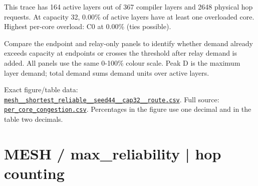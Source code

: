 \documentclass[10pt,a4paper]{article}
\begin{document}
This trace has 164 active layers out of 367 compiler layers and 2648 physical hop requests. At capacity 32, 0.00\% of active layers have at least one overloaded core. Highest per-core overload: C0 at 0.00\% (ties possible).\par
Compare the endpoint and relay-only panels to identify whether demand already exceeds capacity at endpoints or crosses the threshold after relay demand is added. All panels use the same 0-100\% colour scale. Peak D is the maximum layer demand; total demand sums demand units over active layers.\par
Exact figure/table data: \href{\detokenize{file:///home/dhruv-pansuriya/Documents/BTP/Compiler-Driven-ACE/output/pdf/qaoa_methods_congestion/tables/mesh__shortest_reliable__seed44__cap32__route.csv}}{\nolinkurl{mesh__shortest_reliable__seed44__cap32__route.csv}}. Full source: \href{\detokenize{file:///home/dhruv-pansuriya/Documents/BTP/Compiler-Driven-ACE/results/qaoa_2seed_2026-10-26/congestion/per_core_congestion.csv}}{\nolinkurl{per_core_congestion.csv}}. Percentages in the figure use one decimal and in the table two decimals.\par
\clearpage
\section*{MESH / max\_reliability | hop counting}
\end{document}
